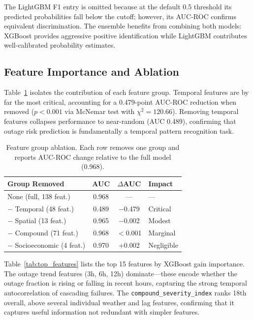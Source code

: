 \documentclass[conference]{IEEEtran}
\begin{document}
The LightGBM F1 entry is omitted because at the default 0.5 threshold its predicted probabilities fall below the cutoff; however, its AUC-ROC confirms equivalent discrimination. The ensemble benefits from combining both models: XGBoost provides aggressive positive identification while LightGBM contributes well-calibrated probability estimates.

\subsection{Feature Importance and Ablation}

Table~\ref{tab:ablation} isolates the contribution of each feature group. Temporal features are by far the most critical, accounting for a 0.479-point AUC-ROC reduction when removed ($p < 0.001$ via McNemar test with $\chi^2 = 120.66$). Removing temporal features collapses performance to near-random (AUC 0.489), confirming that outage risk prediction is fundamentally a temporal pattern recognition task.

\begin{table}[t]
\centering
\caption{Feature group ablation. Each row removes one group and reports AUC-ROC change relative to the full model (0.968).}
\label{tab:ablation}
\begin{tabular}{@{}lccl@{}}
\toprule
\textbf{Group Removed} & \textbf{AUC} & \textbf{$\Delta$AUC} & \textbf{Impact} \\
\midrule
None (full, 138 feat.) & 0.968 & --- & --- \\
$-$ Temporal (48 feat.) & 0.489 & $-$0.479 & Critical \\
$-$ Spatial (13 feat.) & 0.965 & $-$0.002 & Modest \\
$-$ Compound (71 feat.) & 0.968 & $<$0.001 & Marginal \\
$-$ Socioeconomic (4 feat.) & 0.970 & $+$0.002 & Negligible \\
\bottomrule
\end{tabular}
\end{table}

Table~\ref{tab:top_features} lists the top 15 features by XGBoost gain importance. The outage trend features (3h, 6h, 12h) dominate---these encode whether the outage fraction is rising or falling in recent hours, capturing the strong temporal autocorrelation of cascading failures. The \texttt{compound\_severity\_index} ranks 18th overall, above several individual weather and lag features, confirming that it captures useful information not redundant with simpler features.
\end{document}
